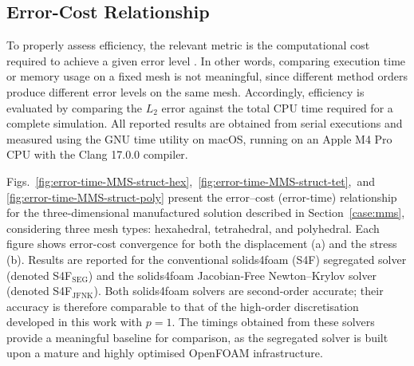 \documentclass[review,3p]{elsarticle}
\begin{document}
\subsection{Error-Cost Relationship}
%
To properly assess efficiency, the relevant metric is the computational cost required to achieve a given error level \cite{wang2013}. 
In other words, comparing execution time or memory usage on a fixed mesh is not meaningful, since different method orders produce different error levels on the same mesh. Accordingly, efficiency is evaluated by comparing the $L_2$ error against the total CPU time required for a complete simulation.
All reported results are obtained from serial executions and measured using the GNU time utility on macOS, running on an Apple M4 Pro CPU with the Clang 17.0.0 compiler.


Figs.~\ref{fig:error-time-MMS-struct-hex},~\ref{fig:error-time-MMS-struct-tet},~and \ref{fig:error-time-MMS-struct-poly} present the error–cost (error-time) relationship for the three-dimensional manufactured solution described in Section~\ref{case:mms}, considering three mesh types: hexahedral, tetrahedral, and polyhedral. 
Each figure shows error-cost convergence for both the displacement (a) and the stress (b). Results are reported for the conventional solids4foam (S4F) segregated solver (denoted 
S4F$_{\text{SEG}}$) and the solids4foam Jacobian-Free Newton–Krylov solver (denoted S4F$_{\text{JFNK}}$). Both solids4foam solvers are second-order accurate; their accuracy is therefore comparable to that of the high-order discretisation developed in this work with $p=1$. The timings obtained from these solvers provide a meaningful baseline for comparison, as the segregated solver is built upon a mature and highly optimised OpenFOAM infrastructure.
\end{document}
